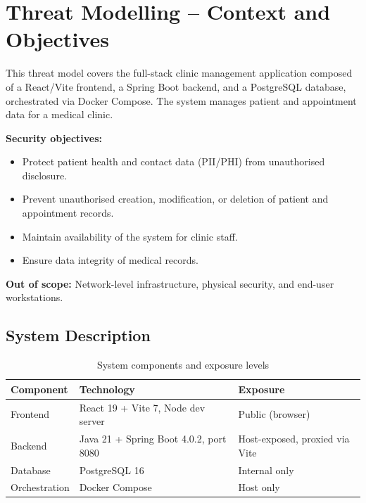 \documentclass[12pt,a4paper]{report}
\begin{document}
\chapter{Threat Modelling -- Context and Objectives}

This threat model covers the full-stack clinic management application composed of a React/Vite frontend, a Spring Boot backend, and a PostgreSQL database, orchestrated via Docker Compose. The system manages patient and appointment data for a medical clinic.

\textbf{Security objectives:}
\begin{itemize}
  \item Protect patient health and contact data (PII/PHI) from unauthorised disclosure.
  \item Prevent unauthorised creation, modification, or deletion of patient and appointment records.
  \item Maintain availability of the system for clinic staff.
  \item Ensure data integrity of medical records.
\end{itemize}

\textbf{Out of scope:} Network-level infrastructure, physical security, and end-user workstations.

\section{System Description}

\begin{table}[H]
\centering
\caption{System components and exposure levels}
\begin{tabularx}{\linewidth}{l X l}
\toprule
\textbf{Component} & \textbf{Technology} & \textbf{Exposure} \\
\midrule
Frontend      & React 19 + Vite 7, Node dev server           & Public (browser) \\
Backend       & Java 21 + Spring Boot 4.0.2, port 8080       & Host-exposed, proxied via Vite \\
Database      & PostgreSQL 16                                 & Internal only \\
Orchestration & Docker Compose                                & Host only \\
\bottomrule
\end{tabularx}
\end{table}
\end{document}
